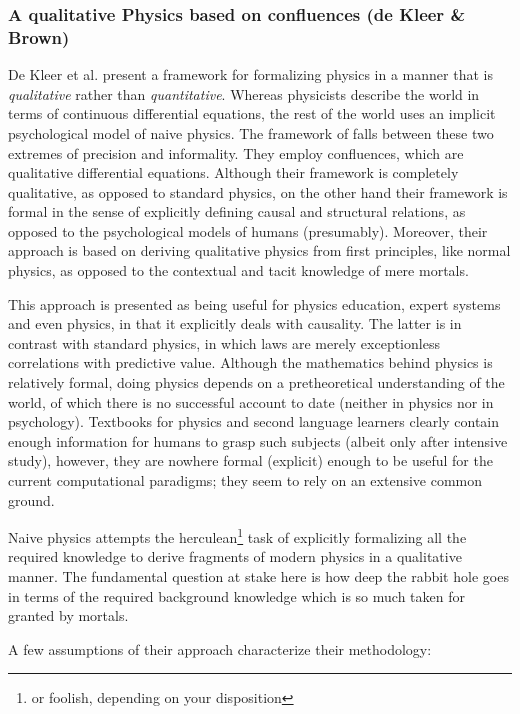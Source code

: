 \documentclass{article} %
\begin{document}
\subsubsection{A qualitative Physics based on confluences (de Kleer \& Brown)}

De Kleer et al. \cite{kleer} present a framework for formalizing physics in a
manner that is {\em qualitative} rather than {\em quantitative}. Whereas
physicists describe the world in terms of continuous differential equations,
the rest of the world uses an implicit psychological model of naive physics.
The framework of \cite{kleer} falls between these two extremes of precision and
informality. They employ confluences, which are qualitative differential
equations.  Although their framework is completely qualitative, as opposed to
standard physics, on the other hand their framework is formal in the sense of
explicitly defining causal and structural relations, as opposed to the
psychological models of humans (presumably). Moreover, their approach is based
on deriving qualitative physics from first principles, like normal physics, as
opposed to the contextual and tacit knowledge of mere mortals.

This approach is presented as being useful for physics education, expert
systems and even physics, in that it explicitly deals with causality. The
latter is in contrast with standard physics, in which laws are merely
exceptionless correlations with predictive value. Although the mathematics
behind physics is relatively formal, doing physics depends on a pretheoretical
understanding of the world, of which there is no successful account to date
(neither in physics nor in psychology). Textbooks for physics and second
language learners clearly contain enough information for humans to grasp
such subjects (albeit only after intensive study), however, they are nowhere
formal (explicit) enough to be useful for the current computational paradigms;
they seem to rely on an extensive common ground.

Naive physics attempts the herculean\footnote{or foolish, depending on your
disposition} task of explicitly formalizing all the required knowledge to
derive fragments of modern physics in a qualitative manner. The fundamental
question at stake here is how deep the rabbit hole goes in terms of the
required background knowledge which is so much taken for granted by mortals.

A few assumptions of their approach characterize their methodology:
\end{document}
